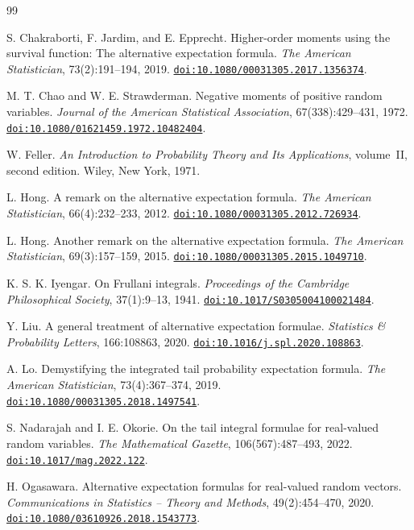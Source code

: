 \documentclass[11pt]{article}
\theoremstyle{definition}
\theoremstyle{remark}
\newcommand{\doi}[1]{\href{https://doi.org/#1}{\nolinkurl{doi:#1}}}
\begin{document}
\begin{thebibliography}{99}

S. Chakraborti, F. Jardim, and E. Epprecht.
Higher-order moments using the survival function: The alternative
expectation formula.
\emph{The American Statistician}, 73(2):191--194, 2019.
\doi{10.1080/00031305.2017.1356374}.

M. T. Chao and W. E. Strawderman.
Negative moments of positive random variables.
\emph{Journal of the American Statistical Association}, 67(338):429--431,
1972. \doi{10.1080/01621459.1972.10482404}.

W. Feller.
\emph{An Introduction to Probability Theory and Its Applications},
volume~II, second edition. Wiley, New York, 1971.

L. Hong.
A remark on the alternative expectation formula.
\emph{The American Statistician}, 66(4):232--233, 2012.
\doi{10.1080/00031305.2012.726934}.

L. Hong.
Another remark on the alternative expectation formula.
\emph{The American Statistician}, 69(3):157--159, 2015.
\doi{10.1080/00031305.2015.1049710}.

K. S. K. Iyengar.
On Frullani integrals.
\emph{Proceedings of the Cambridge Philosophical Society}, 37(1):9--13,
1941.
\doi{10.1017/S0305004100021484}.

Y. Liu.
A general treatment of alternative expectation formulae.
\emph{Statistics \& Probability Letters}, 166:108863, 2020.
\doi{10.1016/j.spl.2020.108863}.

A. Lo.
Demystifying the integrated tail probability expectation formula.
\emph{The American Statistician}, 73(4):367--374, 2019.
\doi{10.1080/00031305.2018.1497541}.

S. Nadarajah and I. E. Okorie.
On the tail integral formulae for real-valued random variables.
\emph{The Mathematical Gazette}, 106(567):487--493, 2022.
\doi{10.1017/mag.2022.122}.

H. Ogasawara.
Alternative expectation formulas for real-valued random vectors.
\emph{Communications in Statistics -- Theory and Methods},
49(2):454--470, 2020.
\doi{10.1080/03610926.2018.1543773}.


\end{thebibliography}
\end{document}
